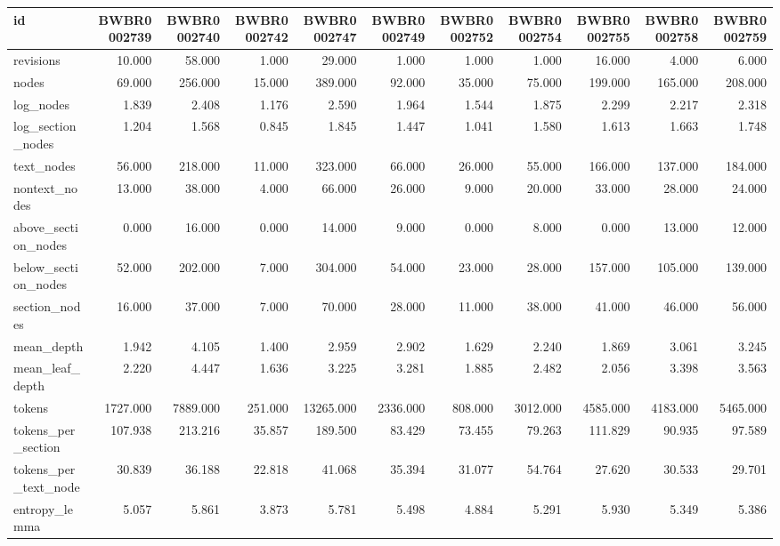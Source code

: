 \begin{tabular}{lrrrrrrrrrr}
\toprule
id & BWBR0002739 & BWBR0002740 & BWBR0002742 & BWBR0002747 & BWBR0002749 & BWBR0002752 & BWBR0002754 & BWBR0002755 & BWBR0002758 & BWBR0002759 \\
\midrule
revisions & 10.000 & 58.000 & 1.000 & 29.000 & 1.000 & 1.000 & 1.000 & 16.000 & 4.000 & 6.000 \\
\cline{1-11}
nodes & 69.000 & 256.000 & 15.000 & 389.000 & 92.000 & 35.000 & 75.000 & 199.000 & 165.000 & 208.000 \\
\cline{1-11}
log\_nodes & 1.839 & 2.408 & 1.176 & 2.590 & 1.964 & 1.544 & 1.875 & 2.299 & 2.217 & 2.318 \\
\cline{1-11}
log\_section\_nodes & 1.204 & 1.568 & 0.845 & 1.845 & 1.447 & 1.041 & 1.580 & 1.613 & 1.663 & 1.748 \\
\cline{1-11}
text\_nodes & 56.000 & 218.000 & 11.000 & 323.000 & 66.000 & 26.000 & 55.000 & 166.000 & 137.000 & 184.000 \\
\cline{1-11}
nontext\_nodes & 13.000 & 38.000 & 4.000 & 66.000 & 26.000 & 9.000 & 20.000 & 33.000 & 28.000 & 24.000 \\
\cline{1-11}
above\_section\_nodes & 0.000 & 16.000 & 0.000 & 14.000 & 9.000 & 0.000 & 8.000 & 0.000 & 13.000 & 12.000 \\
\cline{1-11}
below\_section\_nodes & 52.000 & 202.000 & 7.000 & 304.000 & 54.000 & 23.000 & 28.000 & 157.000 & 105.000 & 139.000 \\
\cline{1-11}
section\_nodes & 16.000 & 37.000 & 7.000 & 70.000 & 28.000 & 11.000 & 38.000 & 41.000 & 46.000 & 56.000 \\
\cline{1-11}
mean\_depth & 1.942 & 4.105 & 1.400 & 2.959 & 2.902 & 1.629 & 2.240 & 1.869 & 3.061 & 3.245 \\
\cline{1-11}
mean\_leaf\_depth & 2.220 & 4.447 & 1.636 & 3.225 & 3.281 & 1.885 & 2.482 & 2.056 & 3.398 & 3.563 \\
\cline{1-11}
tokens & 1727.000 & 7889.000 & 251.000 & 13265.000 & 2336.000 & 808.000 & 3012.000 & 4585.000 & 4183.000 & 5465.000 \\
\cline{1-11}
tokens\_per\_section & 107.938 & 213.216 & 35.857 & 189.500 & 83.429 & 73.455 & 79.263 & 111.829 & 90.935 & 97.589 \\
\cline{1-11}
tokens\_per\_text\_node & 30.839 & 36.188 & 22.818 & 41.068 & 35.394 & 31.077 & 54.764 & 27.620 & 30.533 & 29.701 \\
\cline{1-11}
entropy\_lemma & 5.057 & 5.861 & 3.873 & 5.781 & 5.498 & 4.884 & 5.291 & 5.930 & 5.349 & 5.386 \\

\end{tabular}

